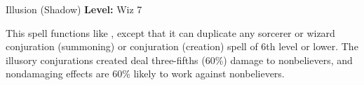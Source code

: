 {Illusion (Shadow)}
{
	\textbf{Level:}
	Wiz 7\\
}
{
	This spell functions like , except that it can duplicate any sorcerer or wizard conjuration (summoning) or conjuration (creation) spell of 6th level or lower. The illusory conjurations created deal three-fifths (60\%) damage to nonbelievers, and nondamaging effects are 60\% likely to work against nonbelievers.

}
